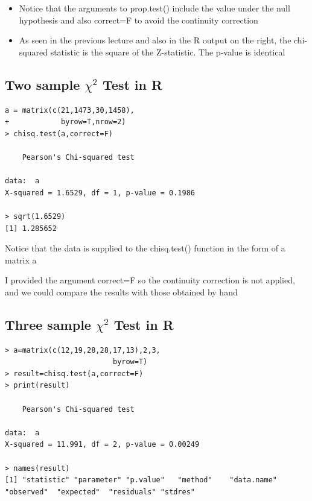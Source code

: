 \documentclass[
]{book}
\providecommand{\tightlist}{%
  \setlength{\itemsep}{0pt}\setlength{\parskip}{0pt}}
\begin{document}
\begin{itemize}
\tightlist
\item
  Notice that the arguments to prop.test() include the value under the null hypothesis and also correct=F to avoid the continuity correction
\item
  As seen in the previous lecture and also in the R output on the right, the chi-squared statistic is the square of the Z-statistic. The p-value is identical
\end{itemize}

\hypertarget{two-sample-chi2-test-in-r}{%
\subsection{\texorpdfstring{Two sample \(\chi^2\) Test in R}{Two sample \textbackslash chi\^{}2 Test in R}}\label{two-sample-chi2-test-in-r}}

\begin{verbatim}
a = matrix(c(21,1473,30,1458),
+            byrow=T,nrow=2)
> chisq.test(a,correct=F)

    Pearson's Chi-squared test

data:  a
X-squared = 1.6529, df = 1, p-value = 0.1986
 
> sqrt(1.6529)
[1] 1.285652
\end{verbatim}

Notice that the data is supplied to the chisq.test() function in the form of a matrix a

I provided the argument correct=F so the continuity correction is not applied, and we could compare the results with those obtained by hand

\hypertarget{three-sample-chi2-test-in-r}{%
\subsection{\texorpdfstring{Three sample \(\chi^2\) Test in R}{Three sample \textbackslash chi\^{}2 Test in R}}\label{three-sample-chi2-test-in-r}}

\begin{verbatim}
> a=matrix(c(12,19,28,28,17,13),2,3,
                         byrow=T)
> result=chisq.test(a,correct=F)
> print(result)

    Pearson's Chi-squared test

data:  a
X-squared = 11.991, df = 2, p-value = 0.00249

> names(result)
[1] "statistic" "parameter" "p.value"   "method"    "data.name" "observed"  "expected"  "residuals" "stdres" 
\end{verbatim}
\end{document}
